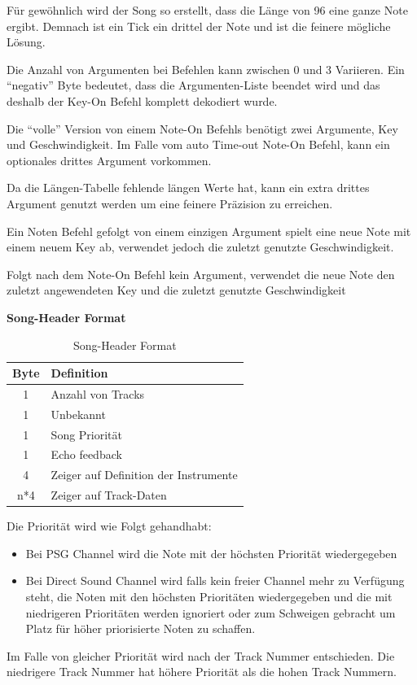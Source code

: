 \documentclass[11pt,a4paper]{scrartcl}
\begin{document}
F\"{u}r gew\"{o}hnlich wird der Song so erstellt, dass die L\"{a}nge von 96 eine ganze Note ergibt. Demnach ist ein Tick ein drittel der Note und ist die feinere m\"{o}gliche L\"{o}sung.

Die Anzahl von Argumenten bei Befehlen kann zwischen 0 und 3 Variieren. Ein "`negativ"' Byte bedeutet, dass die Argumenten-Liste beendet wird und das deshalb der Key-On Befehl komplett dekodiert wurde.

Die "`volle"' Version von einem Note-On Befehls ben\"{o}tigt zwei Argumente, Key und Geschwindigkeit. Im Falle vom auto Time-out Note-On Befehl, kann ein optionales drittes Argument vorkommen. 

Da die L\"{a}ngen-Tabelle fehlende l\"{a}ngen Werte hat, kann ein extra drittes Argument genutzt werden um eine feinere Pr\"{a}zision zu erreichen. 

Ein Noten Befehl gefolgt von einem einzigen Argument spielt eine neue Note mit einem neuem Key ab, verwendet jedoch die zuletzt genutzte Geschwindigkeit.

Folgt nach dem Note-On Befehl kein Argument, verwendet die neue Note den zuletzt angewendeten Key und die zuletzt genutzte Geschwindigkeit


\textbf{{\large Song-Header Format}}

\begin{table}[h]
    \centering
    \begin{tabular}{ c | p{8cm} }
        \textbf{Byte} & \textbf{Definition}\\
        \hline
        1 & Anzahl von Tracks\\
        \hline
        1 & Unbekannt\\
        \hline
        1 & Song Priorit\"{a}t\\
				\hline
        1 & Echo feedback\\
				\hline
        4 & Zeiger auf Definition der Instrumente\\
				\hline
        n*4 & Zeiger auf Track-Daten\\
    \end{tabular}
    \caption{Song-Header Format}
    \label{table:HeaderFormat}
\end{table}

Die Priorit\"{a}t wird wie Folgt gehandhabt:
\begin{itemize}
\item Bei PSG Channel wird die Note mit der h\"{o}chsten Priorit\"{a}t wiedergegeben
\item Bei Direct Sound Channel wird falls kein freier Channel mehr zu Verf\"{u}gung steht, die Noten mit den h\"{o}chsten Priorit\"{a}ten wiedergegeben und die mit niedrigeren Priorit\"{a}ten werden ignoriert oder zum Schweigen gebracht um Platz f\"{u}r h\"{o}her priorisierte Noten zu schaffen.
\end{itemize}
Im Falle von gleicher Priorit\"{a}t wird nach der Track Nummer entschieden. Die niedrigere Track Nummer hat h\"{o}here Priorit\"{a}t als die hohen Track Nummern.
\end{document}
